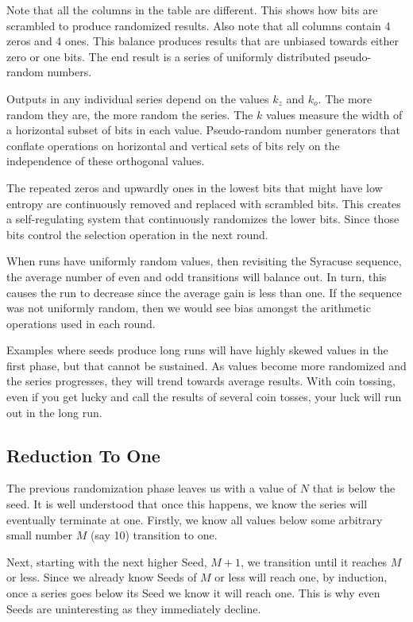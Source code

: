\documentclass[letterpaper]{article}
\begin{document}
\begin{multicols}{2}
Note that all the columns in the table are different. This shows how bits are scrambled to produce randomized results. Also note that all columns contain 4 zeros and 4 ones. This balance produces results that are unbiased towards either zero or one bits. The end result is a series of uniformly distributed pseudo-random numbers.

Outputs in any individual series depend on the values $k_z$ and $k_o$. The more random they are, the more random the series. The $k$ values measure the width of a horizontal subset of bits in each value. Pseudo-random number generators that conflate operations on horizontal and vertical sets of bits rely on the independence of these orthogonal values.

The repeated zeros and upwardly ones in the lowest bits that might have low entropy are continuously removed and replaced with scrambled bits. This creates a self-regulating system that continuously randomizes the lower bits. Since those bits control the selection operation in the next round.

When runs have uniformly random values, then revisiting the Syracuse sequence, the average number of even and odd transitions will balance out. In turn, this causes the run to decrease since the average gain is less than one. If the sequence was not uniformly random, then we would see bias amongst the arithmetic operations used in each round.

Examples where seeds produce long runs will have highly skewed values in the first phase, but that cannot be sustained. As values become more randomized and the series progresses, they will trend towards average results. With coin tossing, even if you get lucky and call the results of several coin tosses, your luck will run out in the long run.

\subsection{Reduction To One}

The previous randomization phase leaves us with a value of \( N \) that is below the seed. It is well understood that once this happens, we know the series will eventually terminate at one. Firstly, we know all values below some arbitrary small number \( M \) (say 10) transition to one.

Next, starting with the next higher Seed, \( M + 1 \), we transition until it reaches \( M \) or less. Since we already know Seeds of \( M \) or less will reach one, by induction, once a series goes below its Seed we know it will reach one. This is why even Seeds are uninteresting as they immediately decline.


\end{multicols}
\end{document}
